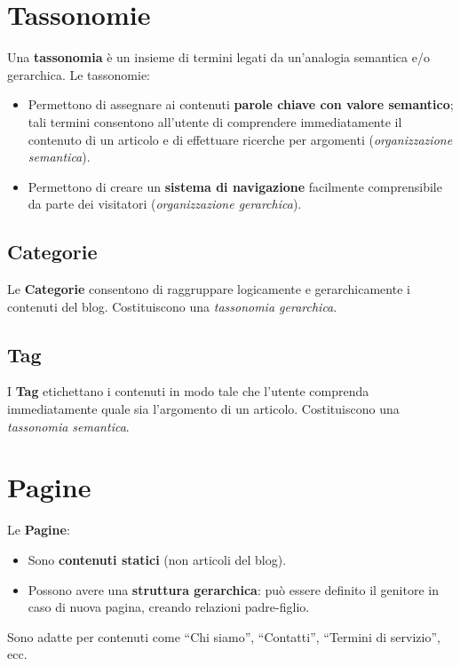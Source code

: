 \section{Tassonomie}

Una \textbf{tassonomia} è un insieme di termini legati da un'analogia semantica e/o gerarchica. Le tassonomie:

\begin{itemize}
    \item Permettono di assegnare ai contenuti \textbf{parole chiave con valore semantico}; tali termini consentono all'utente di comprendere immediatamente il contenuto di un articolo e di effettuare ricerche per argomenti (\emph{organizzazione semantica}).
    \item Permettono di creare un \textbf{sistema di navigazione} facilmente comprensibile da parte dei visitatori (\emph{organizzazione gerarchica}).
\end{itemize}

\subsection{Categorie}

Le \textbf{Categorie} consentono di raggruppare logicamente e gerarchicamente i contenuti del blog. Costituiscono una \emph{tassonomia gerarchica}.

\subsection{Tag}

I \textbf{Tag} etichettano i contenuti in modo tale che l'utente comprenda immediatamente quale sia l'argomento di un articolo. Costituiscono una \emph{tassonomia semantica}.

\section{Pagine}

Le \textbf{Pagine}:

\begin{itemize}
    \item Sono \textbf{contenuti statici} (non articoli del blog).
    \item Possono avere una \textbf{struttura gerarchica}: può essere definito il genitore in caso di nuova pagina, creando relazioni padre-figlio.
\end{itemize}

Sono adatte per contenuti come ``Chi siamo'', ``Contatti'', ``Termini di servizio'', ecc.


